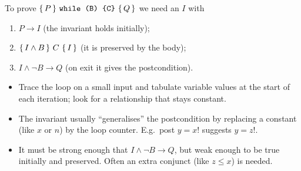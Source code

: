 To prove $\{\,P\,\}\ \texttt{while (B) \{C\}}\ \{\,Q\,\}$ we need an $I$ with
\begin{enumerate}
  \item $P\to I$ \quad(the invariant holds initially);
  \item $\{\,I\land B\,\}\ C\ \{\,I\,\}$ \quad(it is preserved by the body);
  \item $I\land\neg B\to Q$ \quad(on exit it gives the postcondition).
\end{enumerate}

\begin{center}
\end{center}

\begin{important}
\begin{itemize}
  \item Trace the loop on a small input and tabulate variable values at the start of each
        iteration; look for a relationship that stays constant.
  \item The invariant usually ``generalises'' the postcondition by replacing a constant
        (like $x$ or $n$) by the loop counter. E.g.\ post $y=x!$ suggests $y=z!$.
  \item It must be strong enough that $I\land\neg B\to Q$, but weak enough to be true
        initially and preserved. Often an extra conjunct (like $z\le x$) is needed.
\end{itemize}
\end{important}

